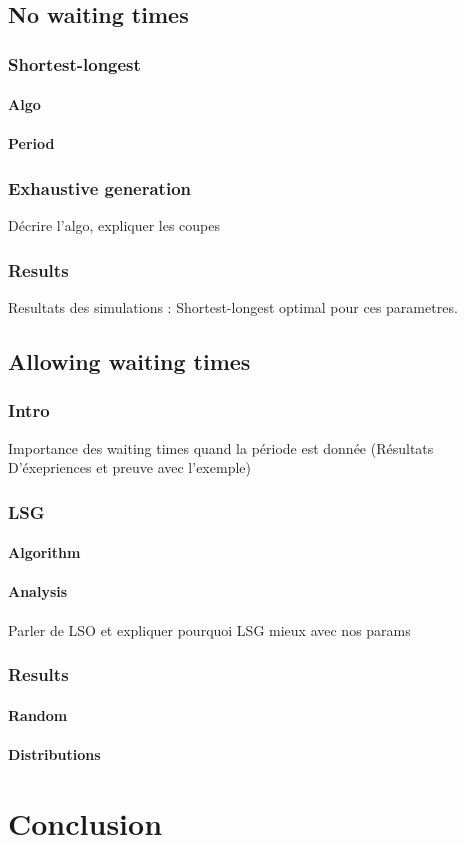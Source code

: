 \documentclass[a4paper,10pt]{article}
\begin{document}
  \subsection{No waiting times}
    \subsubsection{Shortest-longest}
      \paragraph{Algo}
      \paragraph{Period}
    \subsubsection{Exhaustive generation}
      Décrire l'algo, expliquer les coupes
    \subsubsection{Results}
      Resultats des simulations : Shortest-longest optimal pour ces parametres.
      
   \subsection{Allowing waiting times}
     \subsubsection{Intro}
	Importance des waiting times quand la période est donnée (Résultats D'éxepriences et preuve avec l'exemple)
     \subsubsection{LSG}
	\paragraph{Algorithm}
	\paragraph{Analysis}
	  Parler de LSO et expliquer pourquoi LSG mieux avec nos params
     \subsubsection{Results}
	 \paragraph{Random}
	 \paragraph{Distributions}
   
\section{Conclusion}
\end{document}
